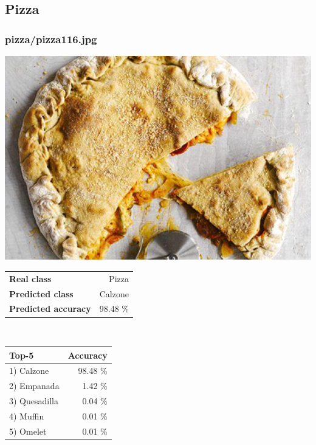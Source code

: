 \subsection{Pizza}
    
\subsubsection{pizza/pizza116.jpg}

\begin{minipage}[t]{0.4\textwidth}
	\vspace{0pt}
	\includegraphics[width=\linewidth]{images/evaluation-images/pizza/pizza116.jpg}
\end{minipage}
\hfill
\begin{minipage}[t]{0.5\textwidth}
	\vspace{0pt}\raggedright
	\begin{tabularx}{\textwidth}{X r}
		\small \textbf{Real class} & \small Pizza\\
		\small \textbf{Predicted class} & \small Calzone\\
		\small \textbf{Predicted accuracy} & \small 98.48 \%
    \end{tabularx}\\
    
    \vspace{6pt}
	\begin{tabularx}{\textwidth}{X r}
        \small \textbf{Top-5} & \small \textbf{Accuracy} \\
        \hline
		\small 1) Calzone & \small 98.48 \%\\\small 2) Empanada & \small 1.42 \%\\\small 3) Quesadilla & \small 0.04 \%\\\small 4) Muffin & \small 0.01 \%\\\small 5) Omelet & \small 0.01 \%
    \end{tabularx}
\end{minipage}
    
